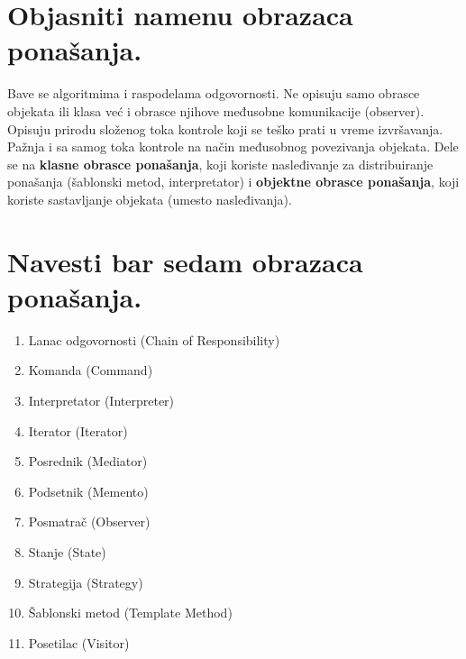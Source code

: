 \documentclass[a4paper]{article}
\begin{document}
\section{Objasniti namenu obrazaca ponašanja.}
  Bave se algoritmima i raspodelama odgovornosti. Ne opisuju samo obrasce objekata ili klasa
  već i obrasce njihove međusobne komunikacije (observer). Opisuju prirodu složenog toka kontrole
  koji se teško prati u vreme izvršavanja. Pažnja i sa samog toka kontrole na način međusobnog
  povezivanja objekata. Dele se na \textbf{klasne obrasce ponašanja}, koji koriste nasleđivanje
  za distribuiranje ponašanja (šablonski metod, interpretator) i \textbf{objektne obrasce ponašanja},
  koji koriste sastavljanje objekata (umesto nasleđivanja).

\section{Navesti bar sedam obrazaca ponašanja.}
  \begin{enumerate}
    \item Lanac odgovornosti (Chain of Responsibility)
    \item Komanda (Command)
    \item Interpretator (Interpreter)
    \item Iterator (Iterator)
    \item Posrednik (Mediator)
    \item Podsetnik (Memento)
    \item Posmatrač (Observer)
    \item Stanje (State)
    \item Strategija (Strategy)
    \item Šablonski metod (Template Method)
    \item Posetilac (Visitor)
  \end{enumerate}
\end{document}
